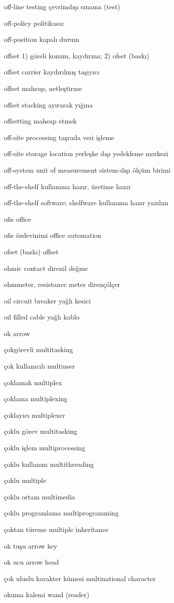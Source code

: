 \documentclass[12pt,fleqn]{article}\usepackage{../../common}
\begin{document}
off-line testing çevrimdışı sınama (test)

off-policy politikasız

off-position kapalı durum

offset 1) göreli konum, kaydırma; 2) ofset (baskı)

offset carrier kaydırılmış taşıyıcı

offset mahsup, netleştirme

offset stacking ayırarak yığma

offsetting mahsup etmek

off-site processing taşrada veri işleme

off-site storage location yerleşke dışı yedekleme merkezi

off-system unit of measurement sistem-dışı ölçüm birimi

off-the-shelf kullanıma hazır, üretime hazır

off-the-shelf software; shelfware kullanıma hazır yazılım

ofis office

ofis özdevinimi office automation

ofset (baskı) offset

ohmic contact direnil değme

ohmmeter, resistance meter dirençölçer

oil circuit breaker yağlı kesici

oil filled cable yağlı kablo

ok arrow

çokgörevli multitasking

çok kullanıcılı multiuser

çoklamak multiplex

çoklama multiplexing

çoklayıcı multiplexer

çoklu görev multitasking

çoklu işlem multiprocessing

çoklu kullanım multithreading

çoklu multiple

çoklu ortam multimedia

çoklu programlama multiprogramming

çoktan türeme multiple inheritance

ok tuşu arrow key

ok ucu arrow head

çok uluslu karakter kümesi multinational character

okuma kalemi wand (reader)
\end{document}
